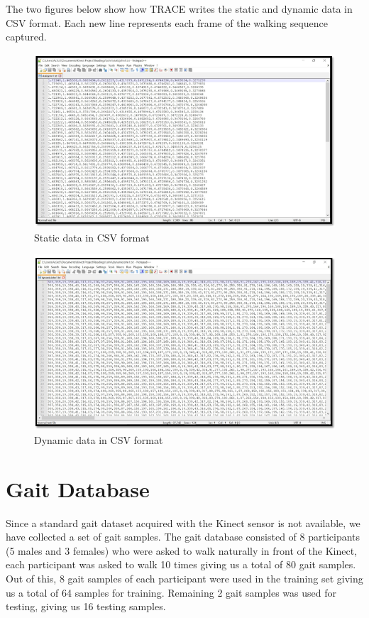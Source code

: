\noindent The two figures below show how TRACE writes the static and dynamic data in CSV format. Each new line represents each frame of the walking sequence captured.\\
\begin{figure}[h]
\centering
\includegraphics[scale=0.6]{static.png}
\caption{Static data in CSV format}
\end{figure}

\begin{figure}[h]
\centering
\includegraphics[scale=0.6]{dynamic.png}
\caption{Dynamic data in CSV format}
\end{figure}


\section{Gait Database} \label{Gait Database}

\noindent Since a standard gait dataset acquired with the Kinect sensor is not available, we have collected a set of gait samples. The gait database consisted of 8 participants (5 males and 3 females) who were asked to walk naturally in front of the Kinect, each participant was asked to walk 10 times giving us a total of 80 gait samples. Out of this, 8 gait samples of each participant were used in the training set giving us a total of 64 samples for training. Remaining 2 gait samples was used for testing, giving us 16 testing samples.

